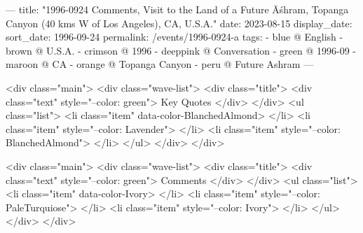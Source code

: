---
title: "1996-0924 Comments, Visit to the Land of a Future Āśhram, Topanga Canyon (40 kms W of Los Angeles), CA, U.S.A."
date: 2023-08-15
display_date: 
sort_date: 1996-09-24
permalink: /events/1996-0924-a
tags:
  - blue @ English
  - brown @ U.S.A.
  - crimson @ 1996
  - deeppink @ Conversation
  - green @ 1996-09
  - maroon @ CA
  - orange @ Topanga Canyon
  - peru @ Future Ashram
---

<div class="main">
  <div class="wave-list">
    <div class="title">
      <div class="text" style="--color: green">
        Key Quotes
      </div>
    </div>
    <ul class="list">
        <li class="item" data-color-BlanchedAlmond>
        </li>
        <li class="item" style="--color: Lavender">
        </li>
        <li class="item" style="--color: BlanchedAlmond">
        </li>
      </ul>
  </div>
</div>

<div class="main">
  <div class="wave-list">
    <div class="title">
      <div class="text" style="--color: green">
        Comments
      </div>
    </div>
    <ul class="list">
        <li class="item" data-color-Ivory>
        </li>
        <li class="item" style="--color: PaleTurquiose">
        </li>
        <li class="item" style="--color: Ivory">
        </li>
      </ul>
  </div>
</div>